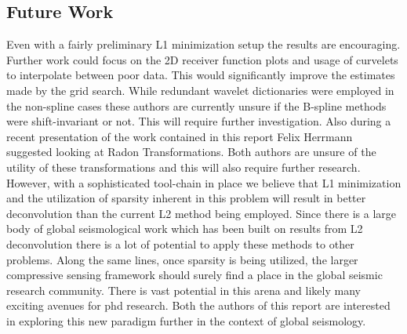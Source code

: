 \documentclass[jgrga]{agutex}
\begin{document}
\begin{article}
\section{Future Work}
Even with a fairly preliminary L1 minimization setup the results are encouraging. Further work could focus on the 2D receiver function plots and usage of curvelets to interpolate between poor data. This would significantly improve the estimates made by the grid search. While redundant wavelet dictionaries were employed in the non-spline cases these authors are currently unsure if the B-spline methods were shift-invariant or not. This will require further investigation. Also during a recent presentation of the work contained in this report Felix Herrmann suggested looking at Radon Transformations. Both authors are unsure of the utility of these transformations and this will also require further research. However, with a sophisticated tool-chain in place we believe that L1 minimization and the utilization of sparsity inherent in this problem will result in better deconvolution than the current L2 method being employed. Since there is a large body of global seismological work which has been built on results from L2 deconvolution there is a lot of potential to apply these methods to other problems. Along the same lines, once sparsity is being utilized, the larger compressive sensing framework should surely find a place in the global seismic research community. There is vast potential in this arena and likely many exciting avenues for phd research. Both the authors of this report are interested in exploring this new paradigm further in the context of global seismology.




\end{article}
\end{document}
